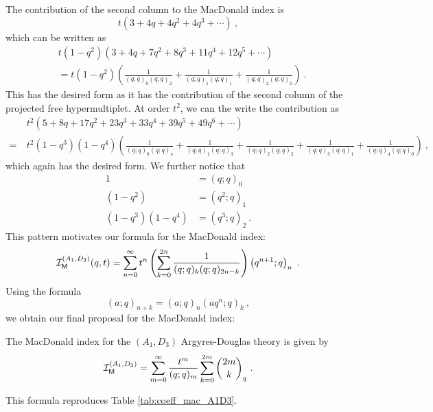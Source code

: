 \documentclass[a4paper,10pt]{article}
\newcommand{\mr}[1]{\mathsf{#1}}
\def\CI {{\cal I}}
\def\CI {{{\cal I}}}
\begin{document}
The contribution of the second column to the MacDonald index is 
\begin{equation}
t\left(3+4 q+4 q^2+4 q^3+\cdots\right)~,    
\end{equation}
which can be written as 
\begin{equation}
\begin{split}
    &t\left(1-q^2\right)\left(3+4 q+7 q^2+8 q^3+11 q^4+12 q^5+\cdots\right)\\&=t\left(1-q^2\right)\left(\frac{1}{(q ; q)_0(q ; q)_2}+\frac{1}{(q ; q)_1(q ; q)_1}+\frac{1}{(q ; q)_2(q ; q)_0}\right)~.
\end{split}
\end{equation}
This has the desired form as it has the contribution of the second column of the projected free hypermultiplet. At order $t^2$, we can the write the contribution as 
\begin{equation}
\begin{split}
    &t^2\left(5+8 q+17 q^2+23 q^3+33 q^4+39 q^5+49 q^6+\cdots\right)\\=~&t^2\left(1-q^3\right)\left(1-q^4\right)\left(\frac{1}{(q ; q)_0(q ; q)_4}+\frac{1}{(q ; q)_1(q ; q)_3}+\frac{1}{(q ; q)_2(q ; q)_2}+\frac{1}{(q ; q)_3(q ; q)_1}+\frac{1}{(q ; q)_4(q ; q)_0}\right)~,
\end{split}
\end{equation}
which again has the desired form. We further notice that 
\begin{equation}
\begin{aligned}
1&=(q ; q)_0 \\
\left(1-q^2\right)&=\left(q^2 ; q\right)_1 \\
\left(1-q^3\right)\left(1-q^4\right)&=\left(q^3 ; q\right)_2~.
\end{aligned}
\end{equation}
This pattern motivates our formula for the MacDonald index:
\begin{equation}
    \CI_{\mr{M}}^{(A_1,D_3)}(q, t)=\sum_{n=0}^{\infty} t^n\left(\sum_{k=0}^{2 n} \frac{1}{(q ; q)_k(q ; q)_{2 n-k}}\right)\left(q^{n+1} ; q\right)_n~.
\end{equation}
Using the formula
\begin{equation}
(a ; q)_{n+k}=(a ; q)_n\left(a q^n ; q\right)_k~,    
\end{equation}
we obtain our final proposal for the MacDonald index:
\begin{conj}
The MacDonald index for the $(A_1,D_3)$ Argyres-Douglas theory is given by 
\begin{equation}\label{eq:Mac_ind_A1D3}
\CI_{\mr{M}}^{(A_1,D_3)}=\sum_{m=0}^\infty 
    \frac{t^m}{(q;q)_m} \sum_{k=0}^{2m}\binom{2m}{k}_q~.    
\end{equation}
\end{conj}
This formula reproduces Table \ref{tab:coeff_mac_A1D3}. 
\end{document}
